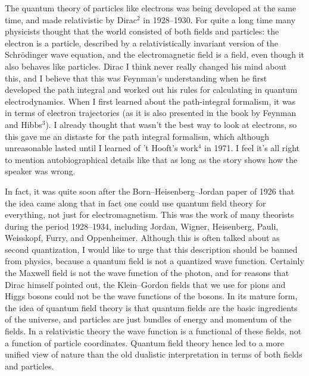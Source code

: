 \documentclass[12pt]{article}
\begin{document}
The quantum theory of particles like electrons was being
developed at the same time, and made relativistic by
Dirac$^2$
in 1928--1930.  For quite a long time many physicists
thought that the world consisted of both fields and
particles:  the electron is a particle, described by a
relativistically invariant version of the Schr\"odinger wave
equation,  and the electromagnetic field is a field, even
though it also behaves like particles.  Dirac I think never
really changed his mind about this, and I believe that this
was Feynman's understanding when he first developed the path
integral and worked out his rules for calculating in quantum
electrodynamics.  When I first learned about the
path-integral formalism, it was in terms of
electron trajectories (as it is also presented in the book
by Feynman and Hibbs$^3$).  I already thought that wasn't
the
best way to look at electrons, so this gave me an
distaste for the path integral formalism, which
although unreasonable lasted until I learned
of 't Hooft's work$^4$ in 1971.  I feel it's all right to
mention autobiographical details like that as long as the
story shows how the speaker was wrong.

In fact, it was quite soon after the
Born--Heisenberg--Jordan paper of 1926 that the idea came
along that in fact
one could use quantum field theory for everything, not just
for electromagnetism.  This was the work of many theorists
during the period 1928--1934, including Jordan, Wigner,
Heisenberg, Pauli, Weisskopf, Furry, and Oppenheimer.
Although this is often talked about as second quantization,
I would like to urge that this description should be banned
from physics, because a quantum field is not a quantized
wave function.  Certainly the Maxwell field is not the wave
function of the photon, and for reasons that Dirac himself
pointed out, the Klein--Gordon fields that we use for pions
and Higgs bosons could not be the wave functions of the
bosons.  In its mature form, the idea of quantum field
theory is that quantum fields are the basic ingredients of
the universe, and particles are just bundles of energy and
momentum of the fields.   In a relativistic theory the  wave
function is a functional of these fields, not a function of
particle coordinates.  Quantum field theory hence led to a
more unified view of nature than the old dualistic
interpretation in terms of both fields and particles.
\end{document}
